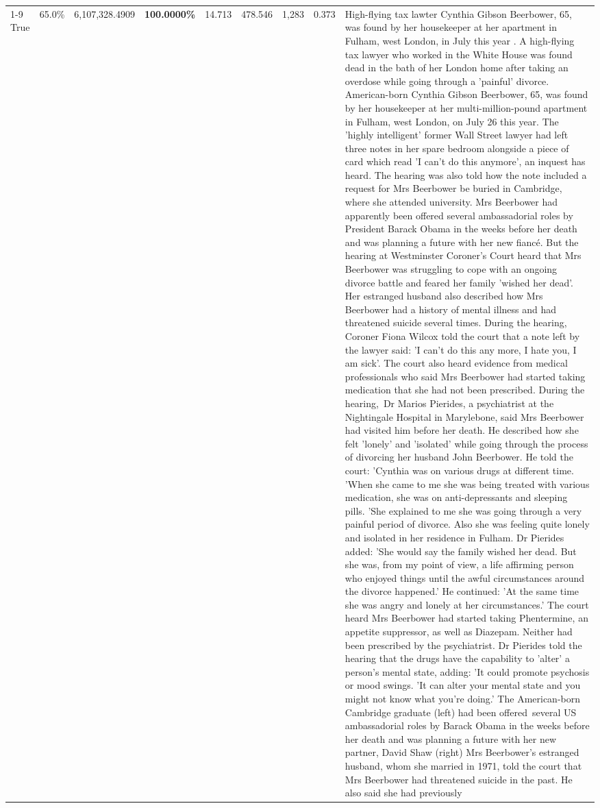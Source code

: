 \begin{table}[H]
\begin{tabular}{lllrlllll}
\cline{1-9}
True & 65.0\% & 6,107,328.4909 & \bfseries \color{red} 100.0000\% & 14.713 & 478.546 & 1,283 & 0.373 & High-flying tax lawter Cynthia Gibson Beerbower, 65, was found by her housekeeper at her apartment in Fulham, west London, in July this year . A high-flying tax lawyer who worked in the White House was found dead in the bath of her London home after taking an overdose while going through a 'painful' divorce. American-born Cynthia Gibson Beerbower, 65, was found by her housekeeper at her multi-million-pound apartment in Fulham, west London, on July 26 this year. The 'highly intelligent' former Wall Street lawyer had left three notes in her spare bedroom alongside a piece of card which read 'I can't do this anymore', an inquest has heard. The hearing was also told how the note included a request for Mrs Beerbower be buried in Cambridge, where she attended university. Mrs Beerbower had apparently been offered several ambassadorial roles by President Barack Obama in the weeks before her death and was planning a future with her new fiancé. But the hearing at Westminster Coroner's Court heard that Mrs Beerbower was struggling to cope with an ongoing divorce battle and feared her family 'wished her dead'. Her estranged husband also described how Mrs Beerbower had a history of mental illness and had threatened suicide several times. During the hearing, Coroner Fiona Wilcox told the court that a note left by the lawyer said: 'I can't do this any more, I hate you, I am sick'. The court also heard evidence from medical professionals who said Mrs Beerbower had started taking medication that she had not been prescribed. During the hearing, Dr Marios Pierides, a psychiatrist at the Nightingale Hospital in Marylebone, said Mrs Beerbower had visited him before her death. He described how she felt 'lonely' and 'isolated' while going through the process of divorcing her husband John Beerbower. He told the court: 'Cynthia was on various drugs at different time. 'When she came to me she was being treated with various medication, she was on anti-depressants and sleeping pills. 'She explained to me she was going through a very painful period of divorce. Also she was feeling quite lonely and isolated in her residence in Fulham. Dr Pierides added: 'She would say the family wished her dead. But she was, from my point of view, a life affirming person who enjoyed things until the awful circumstances around the divorce happened.' He continued: 'At the same time she was angry and lonely at her circumstances.' The court heard Mrs Beerbower had started taking Phentermine, an appetite suppressor, as well as Diazepam. Neither had been prescribed by the psychiatrist. Dr Pierides told the hearing that the drugs have the capability to 'alter' a person's mental state, adding: 'It could promote psychosis or mood swings. 'It can alter your mental state and you might not know what you're doing.' The American-born Cambridge graduate (left) had been offered several US ambassadorial roles by Barack Obama in the weeks before her death and was planning a future with her new partner, David Shaw (right) Mrs Beerbower's estranged husband, whom she married in 1971, told the court that Mrs Beerbower had threatened suicide in the past. He also said she had previously 
\end{tabular}
\end{table}
